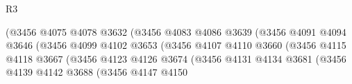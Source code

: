 \begin{lexlean}{R3}
\begin{coremodule}
                                                    (@3456
                                                      @4075
                                                      @4078
                                                      @3632
                                                      (@3456
                                                        @4083
                                                        @4086
                                                        @3639
                                                        (@3456
                                                          @4091
                                                          @4094
                                                          @3646
                                                          (@3456
                                                            @4099
                                                            @4102
                                                            @3653
                                                            (@3456
                                                              @4107
                                                              @4110
                                                              @3660
                                                              (@3456
                                                                @4115
                                                                @4118
                                                                @3667
                                                                (@3456
                                                                  @4123
                                                                  @4126
                                                                  @3674
                                                                  (@3456
                                                                    @4131
                                                                    @4134
                                                                    @3681
                                                                    (@3456
                                                                      @4139
                                                                      @4142
                                                                      @3688
                                                                      (@3456
                                                                        @4147
                                                                        @4150

\end{coremodule}
\end{lexlean}
